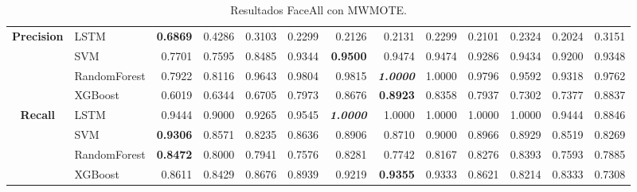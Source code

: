 \begin{table}[H]
\begin{adjustbox}{max width=12cm}
\begin{tabular}{|c|l|r|r|r|r|r|r|r|r|r|r|r|}
			\hline
			\textbf{Precision} & LSTM &  \textbf{0.6869} &  0.4286 &  0.3103 &  0.2299 &  0.2126 &  0.2131 &  0.2299 &  0.2101 &  0.2324 &  0.2024 &  0.3151 \\
			& SVM &  0.7701 &  0.7595 &  0.8485 &  0.9344 &  \textbf{0.9500} &  0.9474 &  0.9474 &  0.9286 &  0.9434 &  0.9200 &  0.9348 \\
			& RandomForest &  0.7922 &  0.8116 &  0.9643 &  0.9804 &  0.9815 &  \textit{\textbf{1.0000}} &  1.0000 &  0.9796 &  0.9592 &  0.9318 &  0.9762 \\
			& XGBoost &  0.6019 &  0.6344 &  0.6705 &  0.7973 &  0.8676 &  \textbf{0.8923} &  0.8358 &  0.7937 &  0.7302 &  0.7377 &  0.8837 \\
			\hline
			\textbf{Recall} & LSTM &  0.9444 &  0.9000 &  0.9265 &  0.9545 &  \textit{\textbf{1.0000}} &  1.0000 &  1.0000 &  1.0000 &  1.0000 &  0.9444 &  0.8846 \\
			& SVM &  \textbf{0.9306} &  0.8571 &  0.8235 &  0.8636 &  0.8906 &  0.8710 &  0.9000 &  0.8966 &  0.8929 &  0.8519 &  0.8269 \\
			& RandomForest &  \textbf{0.8472} &  0.8000 &  0.7941 &  0.7576 &  0.8281 &  0.7742 &  0.8167 &  0.8276 &  0.8393 &  0.7593 &  0.7885 \\
			& XGBoost &  0.8611 &  0.8429 &  0.8676 &  0.8939 &  0.9219 &  \textbf{0.9355} &  0.9333 &  0.8621 &  0.8214 &  0.8333 &  0.7308 \\
			\hline
		\end{tabular}
	\end{adjustbox}
	\caption{Resultados FaceAll con MWMOTE.}
	\label{tab:faceAllMWMOTE}
\end{table}

